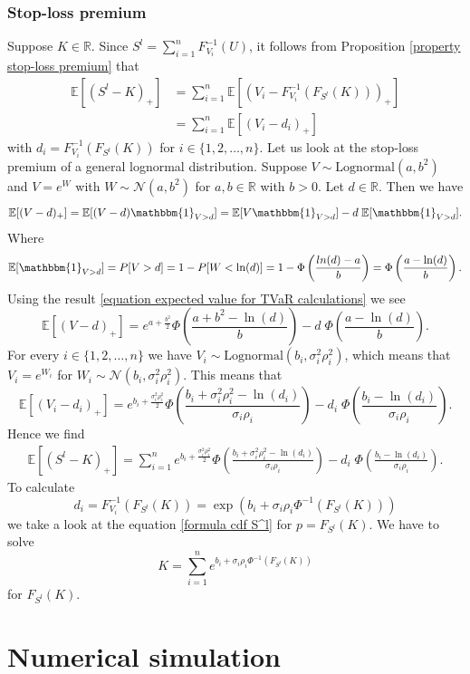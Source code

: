 \documentclass{article}
\begin{document}
\subsubsection{Stop-loss premium}
Suppose $K\in \mathbb{R}$. Since $S^l = \sum_{i=1}^n F_{V_i}^{-1}(U)$, it follows from Proposition \ref{property stop-loss premium} that
\begin{align*}
    \mathbb{E}\left[\left(S^l - K\right)_+\right] &= \sum_{i=1}^n\mathbb{E}\left[\left(V_i - F_{V_i}^{-1}(F_{S^l}(K))\right)_+\right]\\
    &= \sum_{i=1}^n\mathbb{E}\left[\left(V_i - d_i\right)_+\right]
\end{align*}
with $d_i = F_{V_i}^{-1}(F_{S^l}(K))$ for $i\in\{1,2,\dots,n\}$. Let us look at the stop-loss premium of a general lognormal distribution. Suppose $V\sim \text{Lognormal}(a,b^2)$ and $V = e^W$ with $W\sim \mathcal{N}(a,b^2)$ for $a,b\in \mathbb{R}$ with $b > 0$. Let $d\in\mathbb{R}$. Then we have
$$\mathbb{E}[(V-d)_+] = \mathbb{E}[(V-d)\mathbbm{1}_{V > d}]  = \mathbb{E}[V\mathbbm{1}_{V > d}] - d \;\mathbb{E}[\mathbbm{1}_{V > d}].$$
Where
$$\mathbb{E}[\mathbbm{1}_{V > d}] = P[V > d] = 1 - P[W < \ln(d)] = 1 - \Phi\left(\frac{ln(d) - a}{b}\right) = \Phi\left(\frac{a-\ln(d)}{b}\right).$$
Using the result \eqref{equation expected value for TVaR calculations} we see
$$\mathbb{E}[(V-d)_+] = e^{a+\frac{b^2}{2}} \Phi\left(\frac{a+ b^2 - \ln(d)}{b}\right) - d\;\Phi\left(\frac{a-\ln(d)}{b}\right).$$
For every $i\in \{1,2,\dots,n\}$ we have $V_i\sim \text{Lognormal}(b_i, \sigma_i^2\rho_i^2)$, which means that $V_i = e^{W_i}$ for $W_i\sim \mathcal{N}(b_i, \sigma_i^2\rho_i^2)$. This means that
$$\mathbb{E}\left[\left(V_i - d_i\right)_+\right] = e^{b_i+\frac{\sigma_i^2\rho_i^2}{2}} \Phi\left(\frac{b_i + \sigma_i^2\rho_i^2 - \ln(d_i)}{\sigma_i\rho_i}\right) - d_i\;\Phi\left(\frac{b_i-\ln(d_i)}{\sigma_i\rho_i}\right).$$
Hence we find 
\begin{align*} \mathbb{E}\left[\left(S^l - K\right)_+\right] = \sum_{i=1}^n e^{b_i+\frac{\sigma_i^2\rho_i^2}{2}} \Phi\left(\frac{ b_i + \sigma_i^2\rho_i^2 -\ln(d_i)}{\sigma_i\rho_i}\right) - d_i\;\Phi\left(\frac{b_i-\ln(d_i)}{\sigma_i\rho_i}\right).
\end{align*}
To calculate 
$$d_i = F_{V_i}^{-1}(F_{S^l}(K)) = \exp(b_i + \sigma_i\rho_i\Phi^{-1}(F_{S^l}(K)))$$ 
we take a look at the equation \eqref{formula cdf S^l} for $p = F_{S^l}(K)$. We have to solve 
$$K = \sum_{i=1}^n e^{b_i+\sigma_i\rho_i\Phi^{-1}(F_{S^l}(K))}$$
for $F_{S^l}(K)$.


\section{Numerical simulation}
\end{document}
